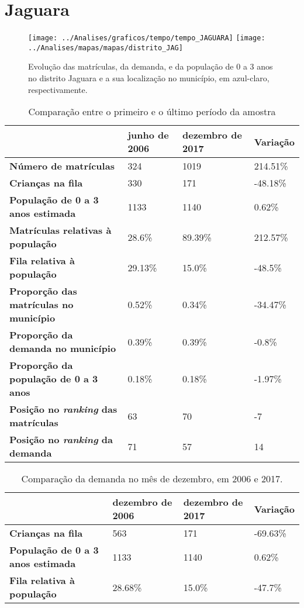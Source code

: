 \section{Jaguara}
\begin{figure}[H]
\centering
\texttt{[image: ../Analises/graficos/tempo/tempo\_JAGUARA]}
\texttt{[image: ../Analises/mapas/mapas/distrito\_JAG]}
\caption{Evolução das matrículas, da demanda, e da população de 0 a 3 anos no distrito Jaguara e a sua localização no município, em azul-claro, respectivamente.}
\end{figure}
\begin{table}[H]
\begin{tabular}{l|l|l|l}
\textbf{}                                      & \textbf{junho de 2006}       & \textbf{dezembro de 2017}    & \textbf{Variação} \\ \hline
\textbf{Número de matrículas}                  & 324 & 1019 & 214.51\% \\ \hline
\textbf{Crianças na fila}                      & 330 & 171 & -48.18\% \\ \hline
\textbf{População de 0 a 3 anos estimada}      & 1133 & 1140 & 0.62\% \\ \hline
\textbf{Matrículas relativas à população}      & 28.6\% & 89.39\% & 212.57\% \\ \hline
\textbf{Fila relativa à população}             & 29.13\% & 15.0\% & -48.5\% \\ \hline
\textbf{Proporção das matrículas no município} & 0.52\% & 0.34\% & -34.47\% \\ \hline
\textbf{Proporção da demanda no município}     & 0.39\% & 0.39\% & -0.8\% \\ \hline
\textbf{Proporção da população de 0 a 3 anos}  & 0.18\% & 0.18\% & -1.97\% \\ \hline
\textbf{Posição no \textit{ranking} das matrículas}     & 63 & 70 & -7 \\ \hline
\textbf{Posição no \textit{ranking} da demanda}         & 71 & 57 & 14 \\ 
\end{tabular}
\caption{Comparação entre o primeiro e o último período da amostra}
\end{table}
\begin{table}[H]
\begin{tabular}{l|l|l|l}
\textbf{}                                 & \textbf{dezembro de 2006} & \textbf{dezembro de 2017} & \textbf{Variação} \\ \hline
\textbf{Crianças na fila}                      & 563 & 171 & -69.63\% \\ \hline
\textbf{População de 0 a 3 anos estimada}      & 1133 & 1140 & 0.62\% \\ \hline
\textbf{Fila relativa à população}             & 28.68\% & 15.0\% & -47.7\% \\
\end{tabular}
\caption{Comparação da demanda no mês de dezembro, em 2006 e 2017.}
\end{table}
